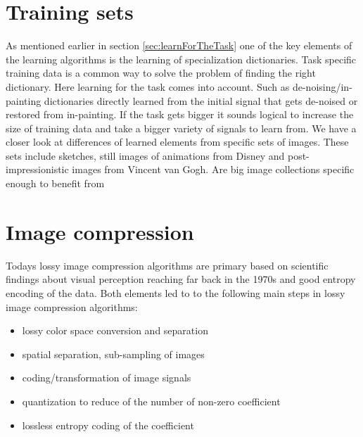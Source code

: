 \section{Training sets}
As mentioned earlier in section \ref{sec:learnForTheTask} one of the key
elements 
of the learning algorithms is the learning of specialization dictionaries.
Task specific training data is a common way to solve the problem of finding 
the right dictionary. Here learning for the task comes into
account. Such as de-noising/in-painting dictionaries directly learned from the
initial signal that gets de-noised or restored from in-painting. If the task
gets bigger it sounds logical to increase the size of training data and take a
bigger variety of signals to learn from.  We have a closer look at differences
of learned elements from specific sets of images. These sets include sketches,
still images of animations from Disney and post-impressionistic images from
Vincent van Gogh. 
Are big image collections specific enough to benefit from 



\section{Image compression}
Todays lossy image compression algorithms are primary based on scientific
findings about visual perception reaching far back in the 1970s\cite{?} and
good entropy encoding of the data. Both elements led to to the
following main steps in lossy image compression algorithms:
\begin{itemize}
 \item lossy color space conversion and separation
 \item spatial separation, sub-sampling of images
 \item coding/transformation of image signals
 \item quantization to reduce of the number of non-zero coefficient 
 \item lossless entropy coding of the coefficient 
\end{itemize}

